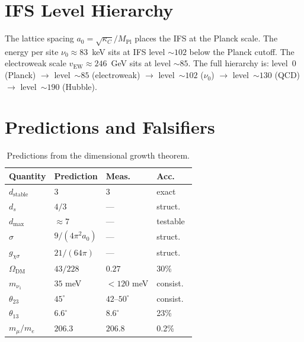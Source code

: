 \documentclass[11pt,twocolumn]{article}
\begin{document}
\section{IFS Level Hierarchy}
\label{sec:hierarchy}

The lattice spacing $a_0=\sqrt{\kappa_C}/M_{\mathrm{Pl}}$ places the IFS at the Planck scale.
The energy per site $\nu_0\approx 83$~keV sits at IFS level $\sim 102$ below the Planck cutoff.
The electroweak scale $v_{\mathrm{EW}}\approx 246$~GeV sits at level $\sim 85$.
The full hierarchy is:
level~0 (Planck) $\to$ level~${\sim}85$ (electroweak) $\to$ level~${\sim}102$ ($\nu_0$) $\to$ level~${\sim}130$ (QCD) $\to$ level~${\sim}190$ (Hubble).

\section{Predictions and Falsifiers}
\label{sec:predictions}

\begin{table}[t]
\centering
\caption{Predictions from the dimensional growth theorem.}
\label{tab:pred3}
\small
\begin{tabular}{@{}l@{\hskip 5pt}l@{\hskip 5pt}l@{\hskip 5pt}l@{}}
\toprule
Quantity & Prediction & Meas.\ & Acc.\ \\
\midrule
$d_{\mathrm{stable}}$ & $3$ & $3$ & exact \\
$d_s$ & $4/3$ & --- & struct.\ \\
$d_{\max}$ & $\approx 7$ & --- & testable \\
$\sigma$ & $9/(4\pi^2 a_0)$ & --- & struct.\ \\
$g_{\chi\sigma}$ & $21/(64\pi)$ & --- & struct.\ \\
$\Omega_{\mathrm{DM}}$ & $43/228$ & $0.27$ & 30\% \\
$m_{\nu_1}$ & $35$ meV & $<120$ meV & consist.\ \\
$\theta_{23}$ & $45^\circ$ & $42$--$50^\circ$ & consist.\ \\
$\theta_{13}$ & $6.6^\circ$ & $8.6^\circ$ & 23\% \\
$m_\mu/m_e$ & $206.3$ & $206.8$ & 0.2\% \\
\bottomrule
\end{tabular}
\end{table}
\end{document}
